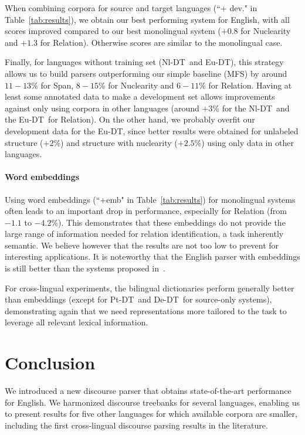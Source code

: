 \documentclass[11pt]{article}
\newcommand{\derst}{De-DT}
\newcommand{\ptrst}{Pt-DT}
\newcommand{\eurst}{Eu-DT}
\newcommand{\nlrst}{Nl-DT}
\begin{document}
When combining corpora for source and target languages (``+ dev." in Table~\ref{tab:results}), we obtain our best performing system for English, with all scores improved compared to our best monolingual system ($+0.8$ for Nuclearity and $+1.3$ for Relation). Otherwise scores are similar to the monolingual case. 

Finally, for languages without training set (\nlrst\ and \eurst), this strategy allows us to build parsers outperforming our simple baseline (MFS) by around $11-13$\% for Span, $8-15$\% for Nuclearity and $6-11$\% for Relation.
Having at least some annotated data to make a development set allows improvements against only using corpora in other languages (around $+3$\% for the \nlrst\ and the \eurst\ for Relation). On the other hand, we probably overfit our development data for the \eurst, since better results were obtained for unlabeled structure ($+2$\%) and structure with nuclearity ($+2.5$\%) using only data in other languages.

\paragraph{Word embeddings}
Using word embeddings (``+emb" in Table~\ref{tab:results}) for monolingual systems often leads to an important drop in performance, especially for Relation (from $-1.1$ to $-4.2$\%).
This demonstrates that these embeddings do not provide the large range of information needed for relation identification, a task inherently semantic.
We believe however that the results are not too low to prevent for interesting applications. 
It is noteworthy that the English parser with embeddings is still better than the systems proposed in~\cite{duverle:hilda:2010,joty:combining:2013}.

For cross-lingual experiments, the bilingual dictionaries perform generally better than embeddings (except for \ptrst\ and \derst\ for source-only systems), demonstrating again that we need representations more tailored to the task to leverage all relevant lexical information. 

\section{Conclusion}

We introduced a new discourse parser that obtains state-of-the-art performance for English. We harmonized discourse treebanks for several languages, enabling us to present results for five other languages for which available corpora are smaller, including the first cross-lingual discourse parsing results in the literature. 
\end{document}
